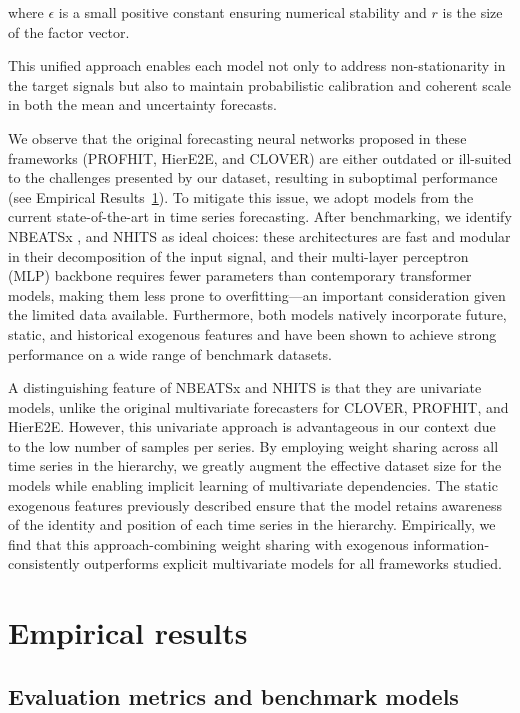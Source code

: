 \documentclass[letterpaper]{article}
\begin{document}
where $\epsilon$ is a small positive constant ensuring numerical stability and $r$ is the size of the factor vector.

This unified approach enables each model not only to address non-stationarity in the target signals but also to maintain probabilistic calibration and coherent scale in both the mean and uncertainty forecasts.

We observe that the original forecasting neural networks proposed in these frameworks (PROFHIT, HierE2E, and CLOVER) are either outdated or ill-suited to the challenges presented by our dataset, resulting in suboptimal performance (see Empirical Results~\ref{sec:empirical_results}). 
To mitigate this issue, we adopt models from the current state-of-the-art in time series forecasting. After benchmarking, we identify NBEATSx \cite{NBEATS}, \cite{NBEATSx} and NHITS \cite{NHITS} as ideal choices: these architectures are fast and modular in their decomposition of the input signal, and their multi-layer perceptron (MLP) backbone requires fewer parameters than contemporary transformer models, making them less prone to overfitting---an important consideration given the limited data available. Furthermore, both models natively incorporate future, static, and historical exogenous features and have been shown to achieve strong performance on a wide range of benchmark datasets.

A distinguishing feature of NBEATSx and NHITS is that they are univariate models, unlike the original multivariate forecasters for CLOVER, PROFHIT, and HierE2E. 
However, this univariate approach is advantageous in our context due to the low number of samples per series. 
By employing weight sharing across all time series in the hierarchy, we greatly augment the effective dataset size for the models while enabling implicit learning of multivariate dependencies. 
The static exogenous features previously described ensure that the model retains awareness of the identity and position of each time series in the hierarchy. 
Empirically, we find that this approach-combining weight sharing with exogenous information-consistently outperforms explicit multivariate models for all frameworks studied.

\section{Empirical results}
\label{sec:empirical_results}

\subsection{Evaluation metrics and benchmark models}
\end{document}
